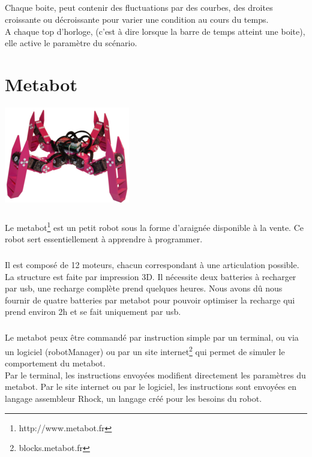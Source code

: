 \documentclass[10pt,a4paper]{report}
\begin{document}
\paragraph{}
Chaque boite, peut contenir des fluctuations par des courbes, des droites croissante ou décroissante pour varier une condition au cours du temps.
\\
A chaque top d'horloge, (c'est à dire lorsque la barre de temps atteint une boite), elle active le paramètre du scénario.


\chapter{Metabot}
\begin{center}
\includegraphics[scale=0.5]{image/metabot.jpg}
\end{center}

\paragraph{}
Le metabot\footnote{http://www.metabot.fr} est un petit robot sous la forme d'araignée disponible à la vente. Ce robot sert essentiellement à apprendre à programmer.
\paragraph{}
Il est composé de 12 moteurs, chacun correspondant à une articulation possible. La structure est faite par impression 3D. 
Il nécessite deux batteries à recharger par usb, une recharge complète prend quelques heures. Nous avons dû nous fournir de quatre batteries par metabot pour pouvoir optimiser la recharge qui prend environ 2h et se fait uniquement par usb.
\paragraph{}
Le metabot peux être commandé par instruction simple par un terminal, ou via un logiciel (robotManager) ou par un site internet\footnote{blocks.metabot.fr} qui permet de simuler le comportement du metabot.
\\
Par le terminal, les instructions envoyées modifient directement les paramètres du metabot. Par le site internet ou par le logiciel, les instructions sont envoyées en langage assembleur Rhock, un langage créé pour les besoins du robot.
\end{document}

